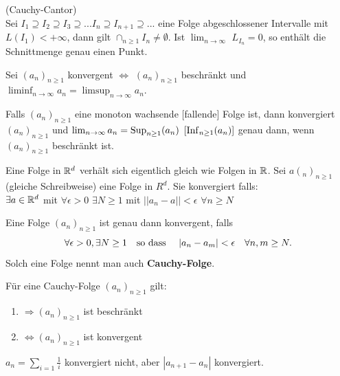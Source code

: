 \Satz (Cauchy-Cantor) \\
Sei $I_{1} \supseteq I_{2} \supseteq I_{3} \supseteq ... I_{n} \supseteq I_{n+1} \supseteq...$ 
eine Folge abgeschlossener Intervalle mit $L(I_{1}) < + \infty$, dann gilt 
$\cap_{n \geq 1} I_{n} \neq \emptyset$. Ist $\lim_{n \to \infty}$ $L_{I_{n}} = 0$, so enthält 
die Schnittmenge genau einen Punkt.



\Bem Sei $(a_n)_{n \geq 1}$ konvergent $\Leftrightarrow$ $(a_n)_{n \geq 1}$ beschränkt
und $\liminf_{n \rightarrow \infty} a_n = \limsup_{n \rightarrow \infty} a_n$.

\Satz Falls $(a_n)_{n \geq 1}$ eine monoton wachsende [fallende] Folge ist, dann konvergiert $(a_n)_{n \geq 1}$ 
und $\lim_{n\rightarrow\infty}a_n=\mathrm{Sup}_{n \geq 1}(a_n)$ $[\mathrm{Inf}_{n \geq 1}(a_n)]$ genau dann, wenn $(a_n)_{n \geq 1}$
beschränkt ist.

Eine Folge in $\mathbb{R}^{d}$ verhält sich eigentlich gleich wie Folgen in $\mathbb{R}$. Sei 
$a(_{n})_{n \geq 1}$(gleiche Schreibweise) eine Folge in $R^{d}$.
Sie konvergiert falls: \\ 
$\exists a \in \mathbb{R}^{d}$ mit $\forall \epsilon > 0$ $\exists N \geq 1$ mit $||a_{n} - a|| < \epsilon$ $\forall n \geq N$


\vspace*{0mm}
\columnbreak



\begin{tcolorbox}
	\Satz Eine Folge $(a_n)_{n \geq 1}$ ist genau dann konvergent, falls
	$$\forall \epsilon > 0, \exists N \geq 1 \text{\quad so dass \quad} |a_n - a_m| < \epsilon \quad \forall n,m \geq N.$$
	Solch eine Folge nennt man auch \textbf{Cauchy-Folge}.
\end{tcolorbox}

\Bem Für eine Cauchy-Folge $(a_n)_{n \geq 1}$ gilt:
\begin{enumerate}[label=(\arabic*)]
	\item $\Rightarrow (a_n)_{n \geq 1}$ ist beschränkt
	\item $\Leftrightarrow (a_n)_{n \geq 1}$ ist konvergent 
\end{enumerate}

\Bem $a_n = \sum_{i=1} \frac{1}{i}$ konvergiert nicht, aber \(|a_{n+1}-a_n|\) konvergiert. 


